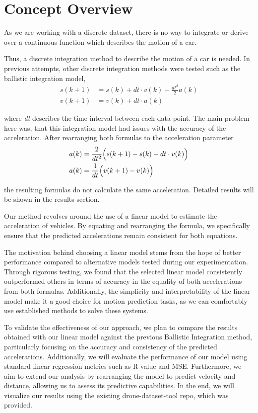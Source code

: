 \section{Concept Overview}
As we are working with a discrete dataset, there is no way to integrate or derive over a continuous function 
which describes the motion of a car. 

Thus, a discrete integration method to describe the motion of a car is needed. 
In previous attempts, other discrete integration methods were tested such as the ballistic integration model, 
\begin{align}
s(k+1) &= s(k) + dt \cdot v(k) + \frac{dt^2}{2} a(k) \\
v(k+1) &= v(k) + dt \cdot                       a(k)
\end{align}

where \textit{dt} describes the time interval between each data point.
The main problem here was, that this integration model had issues with the accuracy of the acceleration. 
After rearranging both formulas to the acceleration parameter 
\begin{align}
    a(k) &= \frac{2}{dt^2} \Bigl( s(k+1) - s(k) - dt \cdot v(k) \Bigr)\\
    a(k) &= \frac{1}{dt} \Bigl( v(k+1) - v(k) \Bigr)
\end{align}

the resulting formulas do not calculate the same acceleration. 
Detailed results will be shown in the results section.

Our method revolves around the use of a linear model to estimate the acceleration of vehicles.
By equating and rearranging the formula, we specifically ensure that the predicted accelerations remain consistent
for both equations.

The motivation behind choosing a linear model stems from the hope of better performance compared 
to alternative models tested during our experimentation. 
Through rigorous testing, we found that the selected linear model consistently outperformed others in 
terms of accuracy in the equality of both accelerations from both formulas.
Additionally, the simplicity and interpretability of the linear model make it a good choice for 
motion prediction tasks, as we can comfortably use established methods to solve these systems. 

To validate the effectiveness of our approach, we plan to compare the results obtained with our linear 
model against the previous Ballistic Integration method, particularly focusing on the accuracy and consistency of 
the predicted accelerations. 
Additionally, we will evaluate the performance of our model using standard linear regression metrics such as 
R-value and MSE. 
Furthermore, we aim to extend our analysis by rearranging the model to predict velocity and distance, 
allowing us to assess its predictive capabilities.
In the end, we will visualize our results using the existing drone-dataset-tool repo, 
which was provided.


